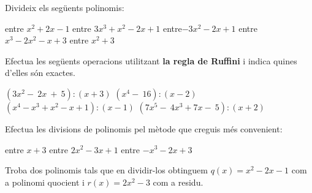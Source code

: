\begin{mylist}

\exer[1]  Divideix els següents polinomis:   
\begin{tasks} 
   \task {} entre \quad $x^{2} +2x-1$
   \task {} entre \quad $3x^{3} +x^{2} -2x+1$
   \task {} entre\quad $-3x^{2} -2x+1$ 
   \task {} entre \quad $x^{3} -2x^{2} -x+3$ 
   \task {} entre \quad $x^{2} +3$ 
\end{tasks}
\answers[cols=1]{[$Q=3x-2$; $R=-2x+5$, $Q=-2$; $R=4x^2-x+6$, $Q=2x^2+3x$; $R=-16x+7$, $Q=3x^2-3x+4$; $R=-x+2$, $Q=x^3-3x$; $R=5x-6$]}

\exer[1]  Efectua les següents operacions utilitzant \textbf{la regla de Ruffini} i indica quines d'elles són exactes.
\begin{tasks} 
  \task  $\left(3x^2-\ 2x\ +\ 5\right):\left(x+3\right)$
  \task  $\left(x^4-\ 16\right):\left(x-2\right)$
  \task  $\left(x^4-x^3+x^2-x+1\right):\left(x-1\right)$
   \task $\left(7x^5-\ 4x^3+7x-\ 5\right):\left(x+2\right)$
\end{tasks}
\answers[cols=1]{[$Q=3x-11$; $R=38$, $Q=x^3+2x^2+4x+8$; $R=0$, $Q=x^3+x$; $R=1$, $Q=7x^4-14x^3+24x^2-48x+103$; $R=-211$]}


 


\exer  Efectua les divisions de polinomis pel mètode que creguis més convenient: 

\begin{tasks} 
	\task  {} entre \quad $x+3$    
	\task  {} entre \quad $2x^{2} -3x+1$
	\task  {} entre \quad $-x^{3} -2x+3$
\end{tasks}

\answers[cols=1]{[$Q=2x^2-5x+3$; $R=-2$, $Q=-4x^4+8x^3+7x^2-21x+8$; $R=2x^2-3x+1$, $Q=3x^2-4$; $R=-2x-2$]}

\exer  Troba dos polinomis tals que en dividir-los obtinguem $q(x)=x^{2} -2x-1$ com a polinomi quocient i $r(x)=2x^{2} -3$ com a residu. 


\end{mylist}


